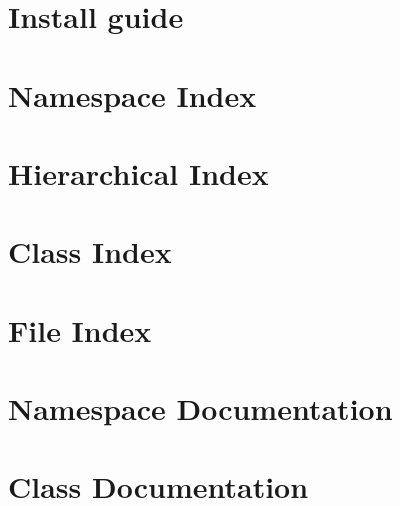 \let\mypdfximage\pdfximage\def\pdfximage{\immediate\mypdfximage}\documentclass[twoside]{book}
\newcommand{\+}{\discretionary{\mbox{\scriptsize$\hookleftarrow$}}{}{}}
\begin{document}
\chapter{Install guide}
\label{md_docs_markdown_install_guide}

\chapter{Namespace Index}

\chapter{Hierarchical Index}

\chapter{Class Index}

\chapter{File Index}

\chapter{Namespace Documentation}












\chapter{Class Documentation}





































\end{document}
